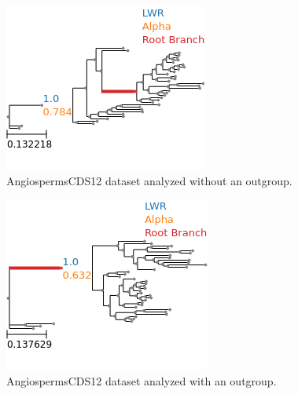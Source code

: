 \documentclass{article}
\begin{document}
%

\begin{figure}
  \begin{center}
    \includegraphics[width=.5\linewidth]{figs/angio/cds12_no_outgroup.png}
    \caption{AngiospermsCDS12 dataset analyzed without an outgroup.}
    \label{fig:angio-cds12-no-outgroup}
  \end{center}
\end{figure}

\begin{figure}
  \begin{center}
    \includegraphics[width=.5\linewidth]{./figs/angio/cds12_with_outgroup.png}
    \caption{AngiospermsCDS12 dataset analyzed with an outgroup.}
    \label{fig:angio-cds12-outgroup}
  \end{center}
\end{figure}
\end{document}

